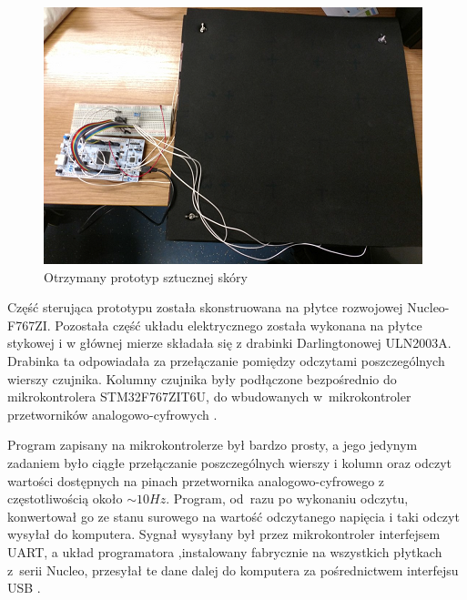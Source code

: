 \begin{figure}[!h]
    \centering 
    \includegraphics[width=0.95\linewidth]{img/otrzymane_prototyp.png}
    \caption{Otrzymany prototyp sztucznej skóry \cite{b_report_otrzymane}}
    \label{f_otrzymany_prototyp}
\end{figure}

Część sterująca prototypu została skonstruowana na płytce rozwojowej Nucleo-F767ZI. Pozostała część układu elektrycznego została wykonana na płytce stykowej i w głównej mierze składała się z drabinki Darlingtonowej ULN2003A. Drabinka ta odpowiadała za przełączanie pomiędzy odczytami poszczególnych wierszy czujnika. Kolumny czujnika były podłączone bezpośrednio do mikrokontrolera STM32F767ZIT6U, do wbudowanych w~mikrokontroler przetworników analogowo-cyfrowych \cite{b_report_otrzymane}.

Program zapisany na mikrokontrolerze był bardzo prosty, a jego jedynym zadaniem było ciągłe przełączanie poszczególnych wierszy i kolumn oraz odczyt wartości dostępnych na pinach przetwornika analogowo-cyfrowego z częstotliwością około $\sim10 Hz$. Program, od~razu po wykonaniu odczytu, konwertował go ze stanu surowego na wartość odczytanego napięcia i taki odczyt wysyłał do komputera. Sygnał wysyłany był przez mikrokontroler interfejsem UART, a układ programatora ,instalowany fabrycznie na wszystkich płytkach z~serii Nucleo, przesyłał te dane dalej do komputera za pośrednictwem interfejsu USB \cite{b_report_otrzymane}.

